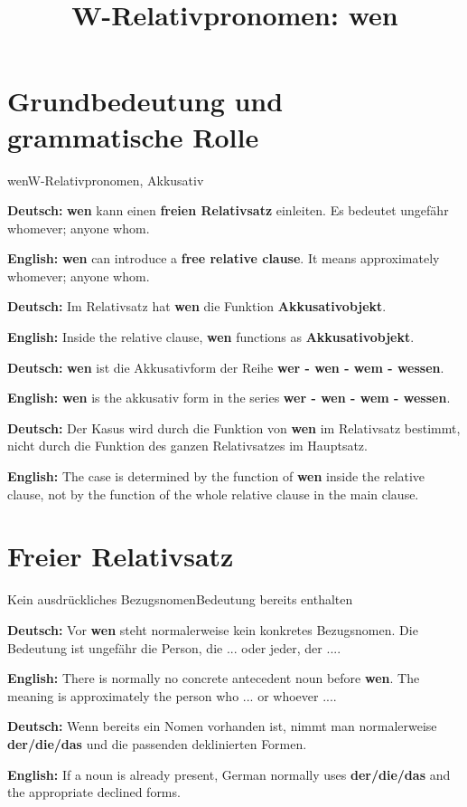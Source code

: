 \documentclass[a4paper,11pt]{article}
\title{W-Relativpronomen: \glqq wen\grqq{}}
\date{}
\newcommand{\GermanText}[1]{\textbf{Deutsch: }#1\par}
\newcommand{\EnglishText}[1]{{\small\color{SoftGray}\textbf{English: }#1\par}}
\begin{document}
\maketitle

\tableofcontents

\newpage

\section{Grundbedeutung und grammatische Rolle}

\begin{grammarentry}{wen}{W-Relativpronomen, Akkusativ}

\GermanText{\textbf{wen} kann einen \textbf{freien Relativsatz} einleiten. Es bedeutet ungefähr \glqq whomever; anyone whom\grqq{}.}

\EnglishText{\textbf{wen} can introduce a \textbf{free relative clause}. It means approximately \glqq whomever; anyone whom\grqq{}.}

\GermanText{Im Relativsatz hat \textbf{wen} die Funktion \textbf{Akkusativobjekt}.}

\EnglishText{Inside the relative clause, \textbf{wen} functions as \textbf{Akkusativobjekt}.}

\GermanText{\textbf{wen} ist die Akkusativform der Reihe \textbf{wer - wen - wem - wessen}.}

\EnglishText{\textbf{wen} is the akkusativ form in the series \textbf{wer - wen - wem - wessen}.}

\GermanText{Der Kasus wird durch die Funktion von \textbf{wen} im Relativsatz bestimmt, nicht durch die Funktion des ganzen Relativsatzes im Hauptsatz.}

\EnglishText{The case is determined by the function of \textbf{wen} inside the relative clause, not by the function of the whole relative clause in the main clause.}

\end{grammarentry}

\section{Freier Relativsatz}

\begin{grammarentry}{Kein ausdrückliches Bezugsnomen}{Bedeutung bereits enthalten}

\GermanText{Vor \textbf{wen} steht normalerweise kein konkretes Bezugsnomen. Die Bedeutung ist ungefähr \glqq die Person, die ...\grqq{} oder \glqq jeder, der ...\grqq{}.}

\EnglishText{There is normally no concrete antecedent noun before \textbf{wen}. The meaning is approximately \glqq the person who ...\grqq{} or \glqq whoever ...\grqq{}.}

\GermanText{Wenn bereits ein Nomen vorhanden ist, nimmt man normalerweise \textbf{der/die/das} und die passenden deklinierten Formen.}

\EnglishText{If a noun is already present, German normally uses \textbf{der/die/das} and the appropriate declined forms.}

\end{grammarentry}
\end{document}
